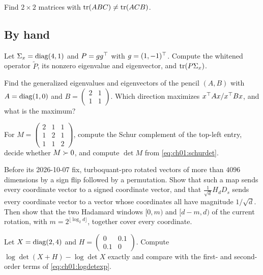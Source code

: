 \begin{exercise}\label{exr:ch01:cyclic}
Find $2\times2$ matrices with $\operatorname{tr}(ABC)\neq\operatorname{tr}(ACB)$.
\end{exercise}

\subsection*{By hand}

\begin{exercise}\label{exr:ch01:whiten}
Let $\Sigma_x=\operatorname{diag}(4,1)$ and $P=gg^{\top}$ with $g=(1,-1)^{\top}$. Compute the whitened
operator $\tilde P$, its nonzero eigenvalue and eigenvector, and $\operatorname{tr}(P\Sigma_x)$.
\end{exercise}

\begin{exercise}\label{exr:ch01:pencil}
Find the generalized eigenvalues and eigenvectors of the pencil $(A,B)$ with
$A=\operatorname{diag}(1,0)$ and $B=\begin{pmatrix}2&1\\1&1\end{pmatrix}$. Which direction
maximizes $x^{\top} Ax/x^{\top} Bx$, and what is the maximum?
\end{exercise}

\begin{exercise}\label{exr:ch01:schur}
For $M=\begin{pmatrix}2&1&1\\1&2&1\\1&1&2\end{pmatrix}$, compute the Schur
complement of the top-left entry, decide whether $M\succ0$, and compute $\det M$
from \cref{eq:ch01:schurdet}.
\end{exercise}

\begin{exercise}\label{exr:ch01:signperm}
Before its 2026-10-07 fix, turboquant-pro rotated vectors of more than $4096$
dimensions by a sign flip followed by a permutation. Show that such a map sends
every coordinate vector to a signed coordinate vector, and that
$\tfrac1{\sqrt d}H_dD_s$ sends every coordinate vector to a vector whose
coordinates all have magnitude $1/\sqrt d$. Then show that the two Hadamard
windows $[0,m)$ and $[d-m,d)$ of the current rotation, with
$m=2^{\lfloor\log_2d\rfloor}$, together cover every coordinate.
\end{exercise}

\begin{exercise}\label{exr:ch01:logdet}
Let $X=\operatorname{diag}(2,4)$ and $H=\begin{pmatrix}0&0.1\\0.1&0\end{pmatrix}$. Compute
$\log\det(X+H)-\log\det X$ exactly and compare with the first- and second-order
terms of \cref{eq:ch01:logdetexp}.
\end{exercise}

